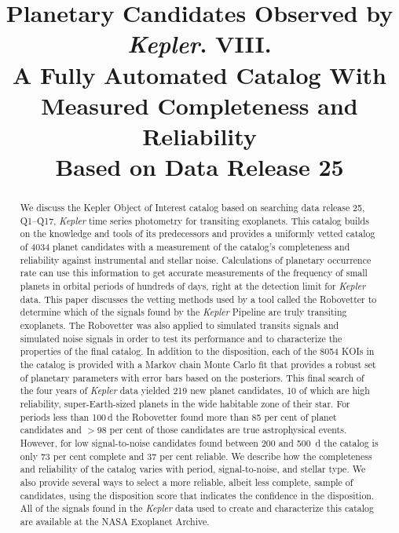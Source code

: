 \documentclass[apj,twocolappendix,numberedappendix]{emulateapj}
\renewcommand{\_}{\discretionary{\underscore}{}{\underscore}}  %
\newcommand\Kepler{\textit{Kepler}}
\begin{document}

\title{Planetary Candidates Observed by \Kepler. VIII.\\
A Fully Automated Catalog With Measured Completeness and Reliability\\Based on Data Release 25 }



\begin{abstract}
We discuss the Kepler Object of Interest catalog based on searching data release 25, Q1--Q17, \Kepler{} time series photometry for transiting exoplanets.  This catalog builds on the knowledge and tools of its predecessors and provides a uniformly vetted catalog of 4034 planet candidates with a measurement of the catalog's completeness and reliability against instrumental and stellar noise. Calculations of planetary occurrence rate can use this information to get accurate measurements of the frequency of small planets in orbital periods of hundreds of days, right at the detection limit for \Kepler{} data.  This paper discusses the vetting methods used by a tool called the Robovetter to determine which of the \ntces{} signals found by the \Kepler{} Pipeline are truly transiting exoplanets.  The Robovetter was also applied to simulated transits signals and simulated noise signals in order to test its performance and to characterize the properties of the final catalog. In addition to the disposition, each of the 8054 KOIs in the catalog is provided with a Markov chain Monte Carlo fit that provides a robust set of planetary parameters with error bars based on the posteriors. This final search of the four years of \Kepler{} data yielded 219 new planet candidates, 10 of which are high reliability, super-Earth-sized planets in the wide habitable zone of their star. For periods less than 100\,d the Robovetter found more than 85 per cent of planet candidates and $>$98 per cent of those candidates are true astrophysical events.   However, for low signal-to-noise candidates found between 200 and 500 \,d the catalog is only 73 per cent complete and 37 per cent reliable. We describe how the completeness and reliability of the catalog varies with period, signal-to-noise, and stellar type. We also provide several ways to select a more reliable, albeit less complete, sample of candidates, using the disposition score that indicates the confidence in the disposition. All of the signals found in the \Kepler{} data used to create and characterize this catalog are available at the NASA Exoplanet Archive.



\end{abstract}
\end{document}
